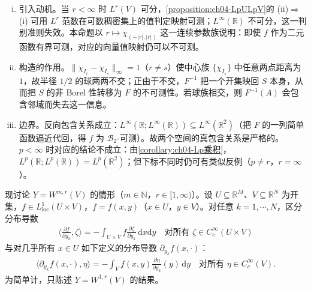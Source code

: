 \documentclass[../../main.tex]{subfiles}%
\begin{document}
\begin{remark}
\begin{enumerate}[(i)]
\item 引入动机。当 $r<\infty$ 时 $L^r(V)$ 可分，\cref{proposition:ch04-LpULpV}的 (ii)$\Rightarrow$(i) 可用 $L^r$ 范数在可数稠密集上的值判定映射可测；$L^\infty(\mathbb{R})$ 不可分，这一判别准则失效。本命题以 $r\mapsto\chi_{(-|r|,|r|)}$ 这一连续参数族说明：即使 $f$ 作为二元函数有界可测，对应的向量值映射仍可以不可测。

\item 构造的作用。$\|\chi_{I_r}-\chi_{I_s}\|_\infty=1$（$r\neq s$）使中心族 $\{\chi_{I_s}\}$ 中任意两点距离为 $1$，故半径 $1/2$ 的球两两不交；正由于不交，$F^{-1}$ 把一个开集映回 $S$ 本身，从而把 $S$ 的非 Borel 性转移为 $F$ 的不可测性。若球族相交，则 $F^{-1}(A)$ 会包含邻域而失去这一信息。

\item 边界。反向包含关系成立：$L^\infty(\mathbb{R};L^\infty(\mathbb{R}))\subseteq L^\infty(\mathbb{R}^2)$（把 $F$ 的一列简单函数逼近代回，得 $f$ 为 $\mathcal{B}_2$-可测）。故两个空间的真包含关系是严格的。$p<\infty$ 时对应的结论不成立：由\cref{corollary:ch04-Lp乘积}，$L^p(\mathbb{R};L^p(\mathbb{R}))=L^p(\mathbb{R}^2)$；但下标不同时仍可有类似反例（$p\neq r$，$r=\infty$）。
\end{enumerate}
\end{remark}

现讨论 $Y=W^{m,r}(V)$ 的情形（$m\in\mathbb{N}$，$r\in[1,\infty)$）。设 $U\subseteq\mathbb{R}^M$、$V\subseteq\mathbb{R}^N$ 为开集，$f\in L^1_{\mathrm{loc}}(U\times V)$，$f=f(x,y)$（$x\in U$，$y\in V$）。对任意 $k=1,\cdots ,N$，区分分布导数
\begin{align}
\Big\langle\frac{\partial f}{\partial y_k},\zeta\Big\rangle=-\int_{U\times V}f\frac{\partial\zeta}{\partial y_k}\,\mathrm{d}x\mathrm{d}y\quad\text{对所有 }\zeta\in C_c^\infty(U\times V) \label{align:ch04-4.123a}
\end{align}
与对几乎所有 $x\in U$ 如下定义的分布导数 $\partial_{y_k}f(x,\cdot)$：
\begin{align}
\langle\partial_{y_k}f(x,\cdot),\eta\rangle=-\int_V f(x,y)\frac{\partial\eta}{\partial y_k}(y)\,\mathrm{d}y\quad\text{对所有 }\eta\in C_c^\infty(V). \label{align:ch04-4.123b}
\end{align}
为简单计，只陈述 $Y=W^{1,r}(V)$ 的结果。
\end{document}
